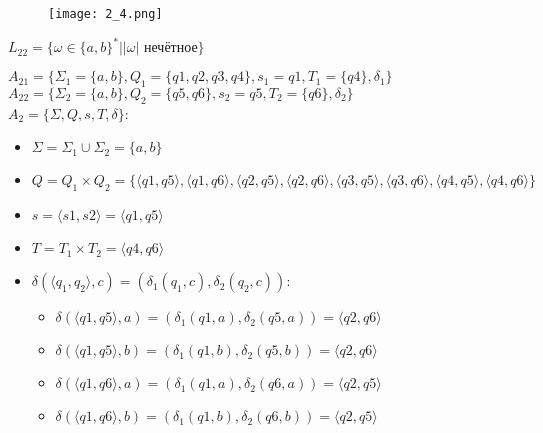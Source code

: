 \documentclass[12pt, a4paper]{article}
\begin{document}
\begin{enumerate}
\begin{comment}
    "" -> q1
    q1 -> q2 [label="a,b"]
    q2 -> q3 [label="a,b"]
    q3 -> q4 [label="a,b"]
    q4 -> q4 [label="a,b"]
}
\end{comment}

    \begin{figure}[H]
        \centering
        \texttt{[image: 2\_4.png]}
    \end{figure}

\(L_{22}=\{\omega \in\{a,b\}^* | |\omega| \text{ нечётное} \} \)

\begin{comment}
digraph {
    rankdir="LR"
    "" [shape=point]
    q5 [shape=circle]
    q6 [shape=doublecircle]
    
    "" -> q5
    q5 -> q6 [label="a,b"]
    q6 -> q5 [label="a,b"]
}
\end{comment}

\(A_{21}=\{\Sigma_1=\{a,b\}, Q_1=\{q1,q2,q3,q4\}, s_1=q1, T_1=\{q4\}, \delta_1\} \)
\\\(A_{22}=\{\Sigma_2=\{a,b\}, Q_2=\{q5,q6\}, s_2=q5, T_2=\{q6\}, \delta_2\} \)
\\\(A_2=\{\Sigma, Q, s, T, \delta\} \):
\begin{itemize}
    \item \(\Sigma=\Sigma_1 \cup \Sigma_2=\{a,b\} \)
    \item \(Q=Q_1 \times Q_2=\{\langle q1,q5 \rangle, \langle q1,q6 \rangle, \langle q2,q5 \rangle, \langle q2,q6 \rangle, \langle q3,q5 \rangle, \langle q3,q6 \rangle, \langle q4,q5 \rangle, \langle q4,q6 \rangle\}\)
    \item \(s=\langle s1,s2 \rangle = \langle q1,q5 \rangle\)
    \item \(T=T_1 \times T_2= \langle q4,q6 \rangle\)
    \item \(\delta(\langle q_1,q_2 \rangle,c)=(\delta_1(q_1,c),\delta_2(q_2,c))\):
    \begin{itemize}
        \item \(\delta(\langle q1,q5 \rangle,a)=(\delta_1(q1,a),\delta_2(q5,a))=\langle q2,q6 \rangle\)
        \item \(\delta(\langle q1,q5 \rangle,b)=(\delta_1(q1,b),\delta_2(q5,b))=\langle q2,q6 \rangle\)
        \item \(\delta(\langle q1,q6 \rangle,a)=(\delta_1(q1,a),\delta_2(q6,a))=\langle q2,q5 \rangle\)
        \item \(\delta(\langle q1,q6 \rangle,b)=(\delta_1(q1,b),\delta_2(q6,b))=\langle q2,q5 \rangle\)
        

\end{itemize}
\end{itemize}
\end{enumerate}
\end{document}
